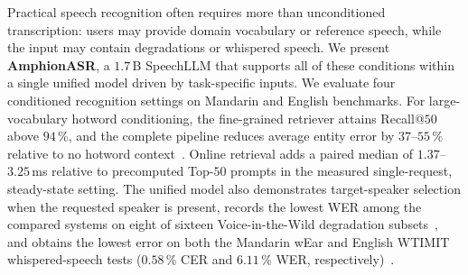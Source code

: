 Practical speech recognition often requires more than unconditioned transcription: users may provide domain vocabulary or reference speech, while the input may contain degradations or whispered speech.
We present \textbf{AmphionASR}, a $1.7$\,B SpeechLLM that
supports all of these conditions within a single unified model driven by
task-specific inputs.
We evaluate four conditioned recognition settings on Mandarin and
English benchmarks. For large-vocabulary hotword conditioning, the
fine-grained retriever attains Recall@$50$ above $94$\,\%, and the
complete pipeline reduces average entity error by $37$--$55$\,\%
relative to no hotword context~\cite{tu2026gigaspeechbench}. Online
retrieval adds a paired median of $1.37$--$3.25$\,ms relative to
precomputed Top-$50$ prompts in the measured single-request,
steady-state setting. The unified model also demonstrates target-speaker
selection when the requested speaker is present, records the lowest WER
among the compared systems on eight of sixteen Voice-in-the-Wild
degradation subsets~\cite{xie2026mega}, and obtains the lowest error on
both the Mandarin wEar and English WTIMIT whispered-speech tests
($0.58$\,\% CER and $6.11$\,\% WER, respectively)~\cite{fang2025whisperear}.
